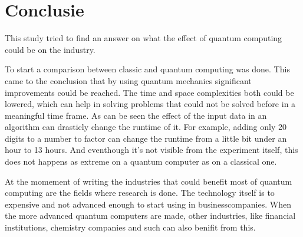 
\chapter{Conclusie}
\label{ch:conclusie}


This study tried to find an answer on what the effect of quantum computing could be on the industry.

To start a comparison between classic and quantum computing was done. This came to the conclusion that by using quantum mechanics significant improvements could be reached.
The time and space complexities both could be lowered, which can help in solving problems that could not be solved before in a meaningful time frame.
As can be seen the effect of the input data in an algorithm can drasticly change the runtime of it. For example, adding only 20 digits to a number to factor can change the runtime from a little bit under an hour to 13 hours.
And eventhough it's not visible from the experiment itself, this does not happens as extreme on a quantum computer as on a classical one.

At the momement of writing the industries that could benefit most of quantum computing are the fields where research is done. The technology itself is to expensive and not advanced enough to start using in businesscompanies.
When the more advanced quantum computers are made, other industries, like financial institutions, chemistry companies and such can also benifit from this.

